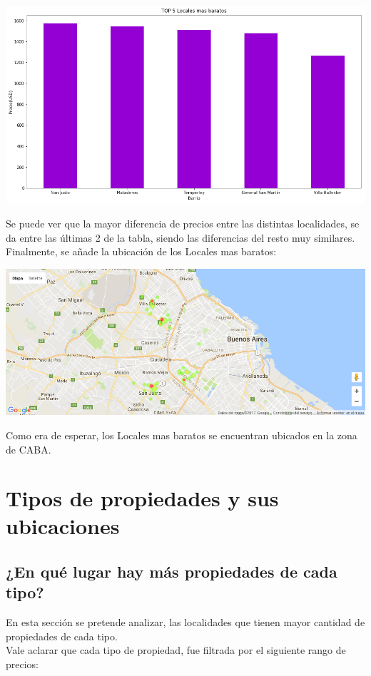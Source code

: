 \documentclass[a4paper, 10pt]{article}
\begin{document}
				\begin{center}
   		    				\includegraphics[width=\textwidth]{images/topLb}
				\end{center}

				Se puede ver que la mayor diferencia de precios entre las distintas localidades, se da entre las últimas 2 de la tabla, siendo las diferencias del resto muy similares.\\
				Finalmente, se añade la ubicación de los Locales mas baratos:

				\begin{center}
   		    				\includegraphics[width=\textwidth]{images/ubicLb}
				\end{center}

				Como era de esperar, los Locales mas baratos se encuentran ubicados en la zona de CABA.


		\section{Tipos de propiedades y sus ubicaciones}
			\subsection{¿En qué lugar hay más propiedades de cada tipo?}
				En esta sección se pretende analizar, las localidades que tienen mayor cantidad de propiedades de cada tipo.\\
				Vale aclarar que cada tipo de propiedad, fue filtrada por el siguiente rango de precios:
\end{document}

